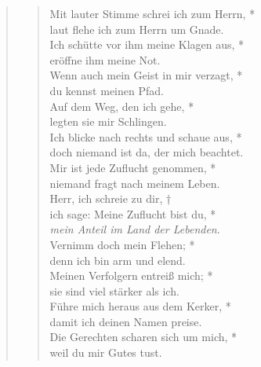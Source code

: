 \begin{quote}
\begin{verse}
\end{verse}


\vspace{0.3cm}

\def\greinitialformat#1{{\fontsize{40}{40}\selectfont #1}}
\gresetfirstlineaboveinitial{\small \textcolor{red}{Ps 142}}{}
\setaboveinitialseparation{0.72mm}


\vspace{0.3cm}


\begin{verse}
 Mit lauter Stimme schrei ich zum Herrn, *\\ 
laut flehe ich zum Herrn um Gnade.\\ \vin
Ich schütte vor ihm meine Klagen aus, *\\ \vin
eröffne ihm meine Not.\\ 
Wenn auch mein Geist in mir verzagt, *\\ 
du kennst meinen Pfad.\\ \vin 
Auf dem Weg, den ich gehe, *\\ \vin legten sie mir Schlingen.\\  
Ich blicke nach rechts und schaue aus, *\\ 
doch niemand ist da, der mich beachtet.\\ \vin 
Mir ist jede Zuflucht genommen, *\\ \vin niemand fragt nach meinem Leben.\\ 
Herr, ich schreie zu dir, †\\
ich sage: Meine Zuflucht bist du, *\\ \textit{ mein Anteil im Land der Lebenden}.\\ \vin 
Vernimm doch mein Flehen; *\\ \vin
denn ich bin arm und elend.\\  
Meinen Verfolgern entreiß mich; *\\  sie sind viel stärker als ich.\\ \vin
Führe mich heraus aus dem Kerker, *\\ \vin
damit ich deinen Namen preise.\\  
Die Gerechten scharen sich um mich, *\\  weil du mir Gutes tust.\\  
\end{verse}




\end{quote}
